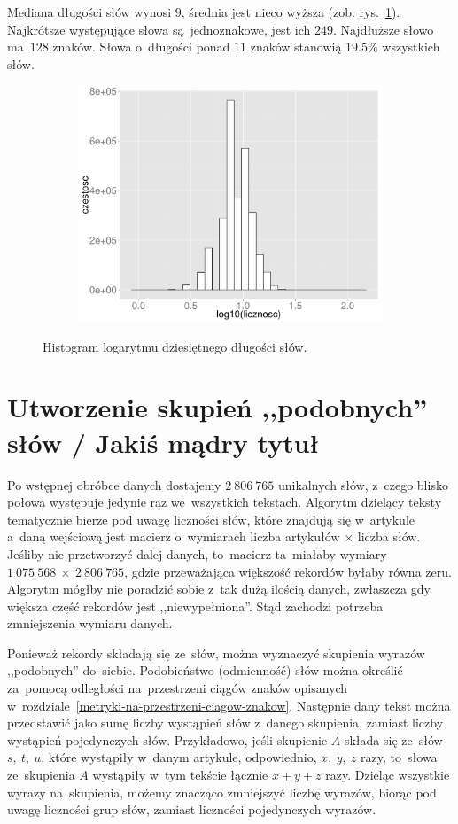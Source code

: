 \documentclass{praca1}
\begin{document}
Mediana długości słów wynosi $9$, średnia jest nieco wyższa (zob. rys.~\ref{plot:003}). Najkrótsze występujące słowa są~jednoznakowe, jest ich $249$. Najdłuższe słowo ma~$128$ znaków. Słowa o~długości ponad $11$ znaków stanowią $19.5\%$ wszystkich słów.

\begin{figure}[!h]
  \centering
  \includegraphics[width=350pt, height=200pt]{plot3.pdf}\\
  \caption{Histogram logarytmu dziesiętnego długości słów.}\label{plot:003}
\end{figure}


\section{Utworzenie skupień ,,podobnych'' słów / Jakiś mądry tytuł}

Po wstępnej obróbce danych dostajemy $2\ 806\ 765$ unikalnych słów, z~czego blisko połowa występuje jedynie raz we~wszystkich tekstach. Algorytm dzielący teksty tematycznie bierze pod uwagę liczności słów, które znajdują się w~artykule a~daną wejściową jest macierz o~wymiarach liczba artykułów $\times$ liczba słów. Jeśliby nie przetworzyć dalej danych, to~macierz ta~miałaby wymiary $1\ 075\ 568\ \times\ 2\ 806\ 765$, gdzie przeważająca większość rekordów byłaby równa zeru. Algorytm mógłby nie poradzić sobie z~tak dużą ilością danych, zwłaszcza gdy większa część rekordów jest ,,niewypełniona''. Stąd zachodzi potrzeba zmniejszenia wymiaru danych. 

Ponieważ rekordy składają się ze~słów, można wyznaczyć skupienia wyrazów ,,podobnych'' do~siebie. Podobieństwo (odmienność) słów można określić za~pomocą odległości na~przestrzeni ciągów znaków opisanych w~rozdziale~\ref{metryki-na-przestrzeni-ciagow-znakow}. Następnie dany tekst można przedstawić jako sumę liczby wystąpień słów z~danego skupienia, zamiast liczby wystąpień pojedynczych słów. Przykładowo, jeśli skupienie $A$ składa się ze~słów $s,\ t,\ u$, które wystąpiły w~danym artykule, odpowiednio, $x,\ y,\ z$ razy, to~słowa ze~skupienia $A$ wystąpiły w~tym tekście łącznie $x+y+z$ razy. Dzieląc wszystkie wyrazy na~skupienia, możemy znacząco zmniejszyć liczbę wyrazów, biorąc pod uwagę liczności grup słów, zamiast liczności pojedynczych wyrazów.
\end{document}
